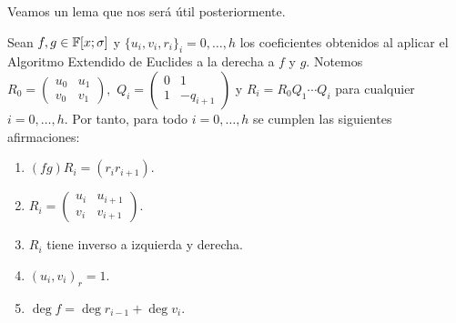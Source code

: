 Veamos un lema que nos será útil posteriormente.

\begin{lemma}
\label{lem:reea}
    Sean \(f, g \in \mathbb{F}[x; \sigma] \) y \(  {\{u_{i}, v_{i}, r_{i}\}}_i = 0, \ldots, h\) los coeficientes obtenidos al aplicar el Algoritmo Extendido de Euclides a la derecha a \(f\) y \(g\). Notemos \(R_{0} =
    \begin{pmatrix}
    u_0 & u_1 \\
    v_0 & v_1
    \end{pmatrix},\)
    \(Q_i =
    \begin{pmatrix}
        0 & 1 \\
        1 & -q_{i+1}
    \end{pmatrix}
    \)
    y \(R_i =  R_0 Q_1 \cdots Q_i\) para cualquier \(i = 0, \ldots, h\). Por tanto, para todo \(i = 0, \ldots, h\) se cumplen las siguientes afirmaciones:

    \begin{enumerate}
        \item \((fg)R_i = (r_{i} r_{i+1})\).
        \item \(R_i =
            \begin{pmatrix}
            u_i &  u_{i+1} \\
            v_{i} & v_{i+1}
            \end{pmatrix}\).
        \item \(R_i\) tiene inverso a izquierda y derecha.
        \item \((u_i, v_i)_r = 1\).
        \item \(\deg f = \deg r_{i-1} + \deg v_{i}\).

    \end{enumerate}
\end{lemma}

